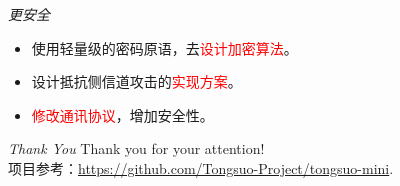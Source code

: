 \documentclass{beamer}
\begin{document}
\begin{frame}{\textit{更安全}}
    \begin{itemize}
        \item 使用轻量级的密码原语，去\textcolor{red}{设计加密算法}。
        \item 设计抵抗侧信道攻击的\textcolor{red}{实现方案}。
        \item \textcolor{red}{修改通讯协议}，增加安全性。
    \end{itemize}
\end{frame}


\begin{frame}{\textit{Thank You}}
    \centering
    \Large
    Thank you for your attention! \\
    \normalsize
    项目参考：\url{https://github.com/Tongsuo-Project/tongsuo-mini}.\\
\end{frame}
\end{document}

